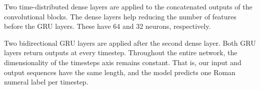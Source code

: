 

Two time-distributed dense layers are applied to the concatenated outputs of the convolutional blocks. The dense layers help reducing the number of features before the GRU layers. These have 64 and 32 neurons, respectively.

Two bidirectional GRU \cite{cho2014learning} layers are applied after the second dense layer.
Both GRU layers return outputs at every timestep.
Throughout the entire network, the dimensionality of the timesteps axis remains constant. That is, our input and output sequences have the same length, and the model predicts one Roman numeral label per timestep.
